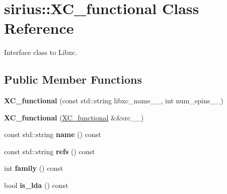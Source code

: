 \hypertarget{classsirius_1_1_x_c__functional}{}\section{sirius\+:\+:X\+C\+\_\+functional Class Reference}
\label{classsirius_1_1_x_c__functional}


Interface class to Libxc.  


\subsection*{Public Member Functions}
\begin{DoxyCompactItemize}
\item 
\hypertarget{classsirius_1_1_x_c__functional_a5991547e3246ee76a9cb3b9aedeaa5b1}{}{\bfseries X\+C\+\_\+functional} (const std\+::string libxc\+\_\+name\+\_\+\+\_\+, int num\+\_\+spins\+\_\+\+\_\+)\label{classsirius_1_1_x_c__functional_a5991547e3246ee76a9cb3b9aedeaa5b1}

\item 
\hypertarget{classsirius_1_1_x_c__functional_a20e1726ae9e53e1226166821b1c94632}{}{\bfseries X\+C\+\_\+functional} (\hyperlink{classsirius_1_1_x_c__functional}{X\+C\+\_\+functional} \&\&src\+\_\+\+\_\+)\label{classsirius_1_1_x_c__functional_a20e1726ae9e53e1226166821b1c94632}

\item 
\hypertarget{classsirius_1_1_x_c__functional_a94455ec6dbd3cbefc73892c2b2944bf5}{}const std\+::string {\bfseries name} () const \label{classsirius_1_1_x_c__functional_a94455ec6dbd3cbefc73892c2b2944bf5}

\item 
\hypertarget{classsirius_1_1_x_c__functional_aadb2770535a57029cd0b5bf9a373e9ab}{}const std\+::string {\bfseries refs} () const \label{classsirius_1_1_x_c__functional_aadb2770535a57029cd0b5bf9a373e9ab}

\item 
\hypertarget{classsirius_1_1_x_c__functional_acabbf185ee020a835838b19b64a56239}{}int {\bfseries family} () const \label{classsirius_1_1_x_c__functional_acabbf185ee020a835838b19b64a56239}

\item 
\hypertarget{classsirius_1_1_x_c__functional_a48248ca9f2c901717bbd4c1f1bdb8731}{}bool {\bfseries is\+\_\+lda} () const \label{classsirius_1_1_x_c__functional_a48248ca9f2c901717bbd4c1f1bdb8731}


\end{DoxyCompactItemize}
